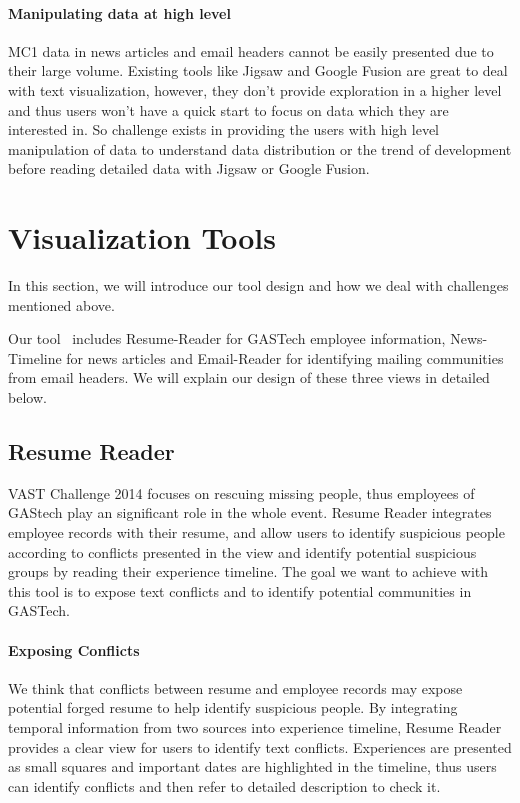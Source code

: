 \documentclass{vgtc}                          %
\begin{document}
\paragraph{Manipulating data at high level}
MC1 data in news articles and email headers cannot be easily presented due to their large volume. Existing tools like Jigsaw and Google Fusion are great to deal with text visualization, however, they don't provide exploration in a higher level and thus users won't have a quick start to focus on data which they are interested in. So challenge exists in providing the users with high level manipulation of data to understand data distribution or the trend of development before reading detailed data with Jigsaw or Google Fusion.

\section{Visualization Tools}
In this section, we will introduce our tool design and how we deal with challenges mentioned above.
\par
Our tool \projectname\ includes Resume-Reader for GASTech employee information, News-Timeline for news articles and Email-Reader for identifying mailing communities from email headers. We will explain our design of these three views in detailed below.
\subsection{Resume Reader}
VAST Challenge 2014 focuses on rescuing missing people, thus employees of GAStech play an significant role in the whole event. Resume Reader integrates employee records with their resume, and allow users to identify suspicious people according to conflicts presented in the view and identify potential suspicious groups by reading their experience timeline. The goal we want to achieve with this tool is to expose text conflicts and to identify potential communities in GASTech.
\paragraph{Exposing Conflicts}
We think that conflicts between resume and employee records may expose potential forged resume to help identify suspicious people. By integrating temporal information from two sources into experience timeline, Resume Reader provides a clear view for users to identify text conflicts. Experiences are presented as small squares and important dates are highlighted in the timeline, thus users can identify conflicts and then refer to detailed description to check it.
\end{document}
